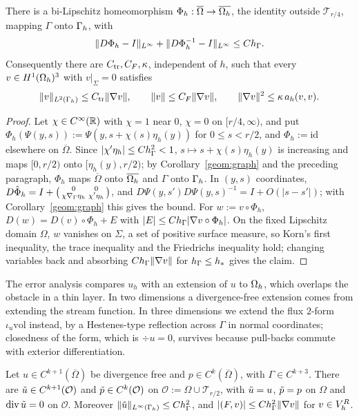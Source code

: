 \begin{lemma}\label{geom:korn}
There is a bi-Lipschitz homeomorphism $\Phi_h:\overline\Omega\to\overline{\Omega_h}$, the identity outside $\mathcal T_{r/4}$, mapping $\Gamma$ onto $\Gamma_h$, with
\[
\lVert D\Phi_h-I\rVert_{L^\infty}+\lVert D\Phi_h^{-1}-I\rVert_{L^\infty}\le Ch_\Gamma .
\]
Consequently there are $C_{\rm tr},C_F,\kappa$, independent of $h$, such that every $v\in H^1(\Omega_h)^3$ with $v|_\Sigma=0$ satisfies
\[
\lVert v\rVert_{L^2(\Gamma_h)}\le C_{\rm tr}\lVert \nabla v\rVert,\qquad\lVert v\rVert\le C_F\lVert \nabla v\rVert,\qquad\lVert \nabla v\rVert^2\le\kappa\,a_h(v,v).
\]
\end{lemma}

\begin{proof}
Let $\chi\in C^\infty(\mathbb R)$ with $\chi=1$ near $0$, $\chi=0$ on $[r/4,\infty)$, and put $\Phi_h(\Psi(y,s)):=\Psi(y,s+\chi(s)\eta_h(y))$ for $0\le s<r/2$, and $\Phi_h:=\mathrm{id}$ elsewhere on $\overline\Omega$. Since $|\chi'\eta_h|\le Ch_\Gamma^2<1$, $s\mapsto s+\chi(s)\eta_h(y)$ is increasing and maps $[0,r/2)$ onto $[\eta_h(y),r/2)$; by Corollary~\ref{geom:graph} and the preceding paragraph, $\Phi_h$ maps $\overline\Omega$ onto $\overline{\Omega_h}$ and $\Gamma$ onto $\Gamma_h$. In $(y,s)$ coordinates, $D\hat\Phi_h=I+\begin{psmallmatrix}0&0\\\chi\nabla_\Gamma\eta_h&\chi'\eta_h\end{psmallmatrix}$, and $D\Psi(y,s')D\Psi(y,s)^{-1}=I+O(|s-s'|)$; with Corollary~\ref{geom:graph} this gives the bound. For $w:=v\circ\Phi_h$, $D(w)=D(v)\circ\Phi_h+E$ with $|E|\le Ch_\Gamma|\nabla v\circ\Phi_h|$. On the fixed Lipschitz domain $\Omega$, $w$ vanishes on $\Sigma$, a set of positive surface measure, so Korn's first inequality, the trace inequality and the Friedrichs inequality hold; changing variables back and absorbing $Ch_\Gamma\lVert \nabla v\rVert$ for $h_\Gamma\le h_\ast$ gives the claim.
\end{proof}

The error analysis compares $u_h$ with an extension of $u$ to $\Omega_h$, which overlaps the obstacle in a thin layer. In two dimensions a divergence-free extension comes from extending the stream function. In three dimensions we extend the flux $2$-form $\iota_u\mathrm{vol}$ instead, by a Hestenes-type reflection across $\Gamma$ in normal coordinates; closedness of the form, which is $\div u=0$, survives because pull-backs commute with exterior differentiation.

\begin{lemma}\label{geom:ext}
Let $u\in C^{k+1}(\overline\Omega)$ be divergence free and $p\in C^k(\overline\Omega)$, with $\Gamma\in C^{k+3}$. There are $\tilde u\in C^{k+1}(\mathcal O)$ and $\tilde p\in C^k(\mathcal O)$ on $\mathcal O:=\Omega\cup\mathcal T_{r/2}$, with $\tilde u=u$, $\tilde p=p$ on $\Omega$ and $\operatorname{div}\tilde u=0$ on $\mathcal O$. Moreover $\lVert \tilde u\rVert_{L^\infty(\Gamma_h)}\le Ch_\Gamma^2$, and $|(F,v)|\le Ch_\Gamma^2\lVert \nabla v\rVert$ for $v\in V_h^R$.
\end{lemma}

